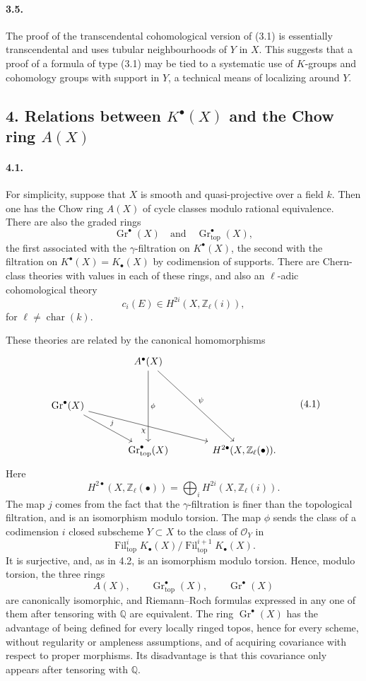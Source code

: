 \documentclass[12pt]{article}
\newcommand{\ZZ}{\mathbb Z}
\newcommand{\QQ}{\mathbb Q}
\newcommand{\cO}{\mathcal O}
\newcommand{\Gr}{\operatorname{Gr}}
\newcommand{\Fil}{\operatorname{Fil}}
\newcommand{\car}{\operatorname{char}}
\newcommand{\topf}{\mathrm{top}}
\begin{document}
\paragraph{3.5.}
The proof of the transcendental cohomological version of (3.1) is essentially transcendental and uses tubular neighbourhoods of $Y$ in $X$. This suggests that a proof of a formula of type (3.1) may be tied to a systematic use of $K$-groups and cohomology groups with support in $Y$, a technical means of localizing around $Y$.

\subsection*{4. Relations between $K^\bullet(X)$ and the Chow ring $A(X)$}

\paragraph{4.1.}
For simplicity, suppose that $X$ is smooth and quasi-projective over a field $k$. Then one has the Chow ring $A(X)$ of cycle classes modulo rational equivalence. There are also the graded rings
\[
\Gr^\bullet(X)
\quad\text{and}\quad
\Gr^\bullet_{\topf}(X),
\]
the first associated with the $\gamma$-filtration on $K^\bullet(X)$, the second with the filtration on $K^\bullet(X)=K_\bullet(X)$ by codimension of supports. There are Chern-class theories with values in each of these rings, and also an $\ell$-adic cohomological theory
\[
c_i(E)\in H^{2i}(X,\ZZ_\ell(i)),
\]
for $\ell\neq\car(k)$.

These theories are related by the canonical homomorphisms
\[
\begin{tikzcd}[column sep=large,row sep=large]
& A^\bullet(X)\arrow[dd,"\phi"]\arrow[rdd,"\psi"] &\\
\Gr^\bullet(X)\arrow[rd,"j"]\arrow[rrd,"\chi"'] &&\\
& \Gr^\bullet_{\topf}(X) & H^{2\bullet}(X,\ZZ_\ell(\bullet)).
\end{tikzcd}
\tag{4.1}
\]
Here
\[
H^{2\bullet}(X,\ZZ_\ell(\bullet))=\bigoplus_i H^{2i}(X,\ZZ_\ell(i)).
\]
The map $j$ comes from the fact that the $\gamma$-filtration is finer than the topological filtration, and is an isomorphism modulo torsion. The map $\phi$ sends the class of a codimension $i$ closed subscheme $Y\subset X$ to the class of $\cO_Y$ in
\[
\Fil^i_{\topf}K_\bullet(X)/\Fil^{i+1}_{\topf}K_\bullet(X).
\]
It is surjective, and, as in 4.2, is an isomorphism modulo torsion. Hence, modulo torsion, the three rings
\[
A(X),\qquad \Gr^\bullet_{\topf}(X),\qquad \Gr^\bullet(X)
\]
are canonically isomorphic, and Riemann--Roch formulas expressed in any one of them after tensoring with $\QQ$ are equivalent. The ring $\Gr^\bullet(X)$ has the advantage of being defined for every locally ringed topos, hence for every scheme, without regularity or ampleness assumptions, and of acquiring covariance with respect to proper morphisms. Its disadvantage is that this covariance only appears after tensoring with $\QQ$.
\end{document}
